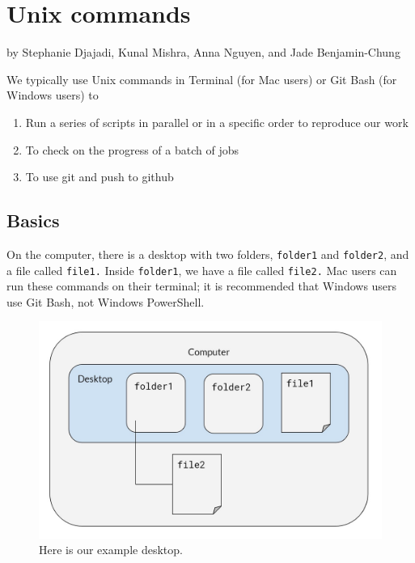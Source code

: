 \documentclass[
]{book}
\providecommand{\tightlist}{%
  \setlength{\itemsep}{0pt}\setlength{\parskip}{0pt}}
\begin{document}
\hypertarget{unix}{%
\chapter{Unix commands}\label{unix}}

by Stephanie Djajadi, Kunal Mishra, Anna Nguyen, and Jade Benjamin-Chung

We typically use Unix commands in Terminal (for Mac users) or Git Bash (for Windows users) to

\begin{enumerate}
\def\labelenumi{\arabic{enumi}.}
\tightlist
\item
  Run a series of scripts in parallel or in a specific order to reproduce our work
\item
  To check on the progress of a batch of jobs
\item
  To use git and push to github
\end{enumerate}

\hypertarget{basics-1}{%
\section{Basics}\label{basics-1}}

On the computer, there is a desktop with two folders, \texttt{folder1} and \texttt{folder2}, and a file called \texttt{file1.} Inside \texttt{folder1}, we have a file called \texttt{file2.} Mac users can run these commands on their terminal; it is recommended that Windows users use Git Bash, not Windows PowerShell.

\begin{figure}
\centering
\includegraphics{assets/images/ex-desktop.jpg}
\caption{Here is our example desktop.}
\end{figure}
\end{document}
